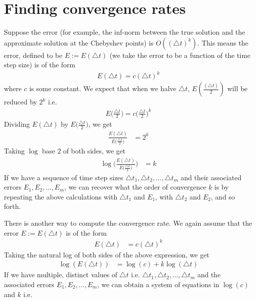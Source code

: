 

\section*{Finding convergence rates}
Suppose the error (for example, the inf-norm between the true solution and the approximate solution at the Chebyshev points) is $O((\triangle t)^k)$.
This means the error, defined to be $E := E(\triangle t)$ (we take the error to be a function of the time step size) is of the form
\begin{align*}
	E(\triangle t) = c (\triangle t)^{k}
\end{align*}
where $c$ is some constant.
We expect that when we halve $\triangle t$, $E(\frac{(\triangle t)}{2})$ will be reduced by $2^{k}$ i.e.
\begin{align*}
	E\Big( \frac{\triangle t}{2} \Big) = c \Big( \frac{\triangle t}{2} \Big)^{k}
\end{align*}
Dividing $E(\triangle t)$ by $E \Big( \frac{\triangle t}{2} \Big)$, we get
\begin{align*}
	\frac{ E (\triangle t) }{ E \Big( \frac{\triangle t}{2} \Big) } & = 2^{k}
\end{align*}
Taking $\log$ base $2$ of both sides, we get
\begin{align*}
	\log \Bigg( \frac{ E (\triangle t) }{ E \Big( \frac{\triangle t}{2} \Big) } \Bigg) & = k
\end{align*}
If we have a sequence of time step sizes $\triangle t_{1}, \triangle t_{2}, \hdots, \triangle t_{m}$ and their associated errors $E_{1}, E_{2}, \hdots, E_{m}$, we can recover what the order of convergence $k$ is by repeating the above calculations with $\triangle t_{1}$ and $E_{1}$, with $\triangle t_{2}$ and $E_{2}$, and so forth.
\par 
There is another way to compute the convergence rate.
We again assume that the error $E := E(\triangle t)$ is of the form
\begin{align*}
	E(\triangle t) & = c (\triangle t)^{k}
\end{align*}
Taking the natural log of both sides of the above expression, we get
\begin{align*}
	\log (E(\triangle t)) & = \log(c) + k \log(\triangle t)
\end{align*}
If we have multiple, distinct values of $\triangle t$ i.e. $\triangle t_{1}, \triangle t_{2}, \hdots, \triangle t_{m}$ and the associated errors $E_{1}, E_{2}, \hdots, E_{m}$, we can obtain a system of equations in $\log(c)$ and $k$ i.e.
